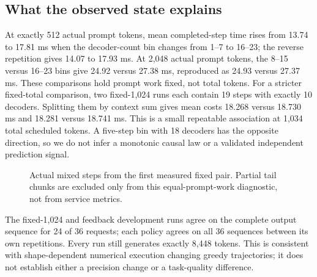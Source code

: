 
\subsection{What the observed state explains}
At exactly 512 actual prompt tokens, mean completed-step time rises from
13.74 to 17.81 ms when the decoder-count bin changes from 1--7 to 16--23;
the reverse repetition gives 14.07 to 17.93 ms. At 2,048 actual prompt tokens,
the 8--15 versus 16--23 bins give 24.92 versus 27.38 ms, reproduced as
24.93 versus 27.37 ms. These comparisons hold prompt work fixed, not total tokens.
For a stricter fixed-total comparison, two fixed-1,024 runs each contain 19 steps
with exactly 10 decoders. Splitting them by context sum gives mean costs
18.268 versus 18.730 ms and 18.281 versus 18.741 ms. This is a small repeatable
association at 1,034 total scheduled tokens. A five-step bin with 18 decoders
has the opposite direction, so we do not infer a monotonic causal law or a
validated independent prediction signal.

\begin{figure}[htbp]\centering
{}
\caption{Actual mixed steps from the first measured fixed pair. Partial tail
chunks are excluded only from this equal-prompt-work diagnostic, not from service metrics.}
\end{figure}

The fixed-1,024 and feedback development runs agree on the complete output
sequence for 24 of 36 requests; each policy agrees on all 36 sequences between
its own repetitions. Every run still generates exactly 8,448 tokens. This is
consistent with shape-dependent numerical execution changing greedy trajectories;
it does not establish either a precision change or a task-quality difference.
